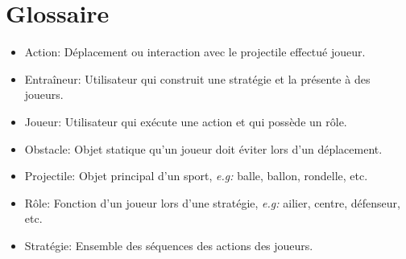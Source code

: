 %

\chapter{Glossaire}
\label{s:glossaire}

\begin{itemize}
    \item Action: Déplacement ou interaction avec le projectile effectué joueur.
        \\
    \item Entra\^ineur: Utilisateur qui construit une strat\'egie et la pr\'esente \`a des joueurs.
        \\
    \item Joueur: Utilisateur qui ex\'ecute une action et qui poss\`ede un r\^ole.
        \\
    \item Obstacle: Objet statique qu'un joueur doit \'eviter lors d'un d\'eplacement.
        \\
    \item Projectile: Objet principal d'un sport, \textit{e.g:} balle, ballon, rondelle, etc.
        \\
    \item R\^ole: Fonction d'un joueur lors d'une strat\'egie, \textit{e.g:} ailier, centre, d\'efenseur, etc.
        \\
    \item Stratégie: Ensemble des s\'equences des actions des joueurs.
        \\
\end{itemize}
